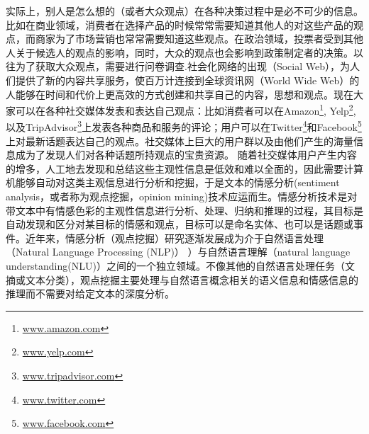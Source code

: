 实际上，别人是怎么想的（或者大众观点）在各种决策过程中是必不可少的信息。比如在商业领域，消费者在选择产品的时候常常需要知道其他人的对这些产品的观点，而商家为了市场营销也常常需要知道这些观点。在政治领域，投票者受到其他人关于候选人的观点的影响，同时，大众的观点也会影响到政策制定者的决策。以往为了获取大众观点，需要进行问卷调查.社会化网络的出现（Social Web），为人们提供了新的内容共享服务，使百万计连接到全球资讯网（World Wide Web）的人能够在时间和代价上更高效的方式创建和共享自己的内容，思想和观点。现在大家可以在各种社交媒体发表和表达自己观点：比如消费者可以在Amazon\footnote{\url{www.amazon.com}}, Yelp\footnote{\url{www.yelp.com}}, 以及TripAdvisor\footnote{\url{www.tripadvisor.com}}上发表各种商品和服务的评论；用户可以在Twitter\footnote{\url{www.twitter.com}}和Facebook\footnote{\url{www.facebook.com}}上对最新话题表达自己的观点。社交媒体上巨大的用户群以及由他们产生的海量信息成为了发现人们对各种话题所持观点的宝贵资源。
随着社交媒体用户产生内容的增多，人工地去发现和总结这些主观性信息是低效和难以全面的，因此需要计算机能够自动对这类主观信息进行分析和挖掘，于是文本的情感分析(sentiment analysis，或者称为观点挖掘，opinion mining)技术应运而生。情感分析技术是对带文本中有情感色彩的主观性信息进行分析、处理、归纳和推理的过程，其目标是自动发现和区分对某目标的情感和观点，目标可以是命名实体、也可以是话题或事件。近年来，情感分析（观点挖掘）研究逐渐发展成为介于自然语言处理（Natural Language Processing (NLP)） ）与自然语言理解（natural language understanding(NLU)）之间的一个独立领域。不像其他的自然语言处理任务（文摘或文本分类），观点挖掘主要处理与自然语言概念相关的语义信息和情感信息的推理而不需要对给定文本的深度分析。


